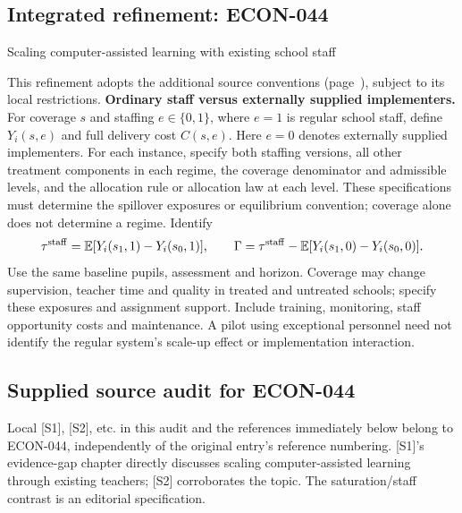 \documentclass[11pt,a4paper]{article}
\begin{document}
\subsection*{Integrated refinement: ECON-044}
{\sffamily\small\color{muted}Scaling computer-assisted learning with existing school staff\par}
This refinement adopts the additional source conventions
(page~\pageref{audited:conventions}), subject to its local restrictions.
\textbf{Ordinary staff versus externally supplied implementers.}
For coverage $s$ and staffing $e\in\{0,1\}$, where $e=1$ is regular school staff,
define $Y_i(s,e)$ and full delivery cost $C(s,e)$. Here $e=0$ denotes externally supplied implementers. For each instance, specify both staffing versions, all other treatment components in each regime, the coverage denominator and admissible levels, and the allocation rule or allocation law at each level. These specifications must determine the spillover exposures or equilibrium convention; coverage alone does not determine a regime. Identify
\[
\tau^{\rm staff}=\mathbb E[Y_i(s_1,1)-Y_i(s_0,1)],\qquad
\Gamma=\tau^{\rm staff}
       -\mathbb E[Y_i(s_1,0)-Y_i(s_0,0)].
\]
Use the same baseline pupils, assessment and horizon. Coverage may change
supervision, teacher time and quality in treated and untreated schools; specify
these exposures and assignment support. Include training, monitoring, staff
opportunity costs and maintenance. A pilot using exceptional personnel need not
identify the regular system's scale-up effect or implementation interaction.
\subsection*{Supplied source audit for ECON-044}
Local [S1], [S2], etc. in this audit and the references immediately below
belong to ECON-044, independently of the original entry's reference numbering.
[S1]'s evidence-gap chapter directly discusses scaling computer-assisted learning through existing teachers; [S2] corroborates the topic. The saturation/staff contrast is an editorial specification.
\end{document}

